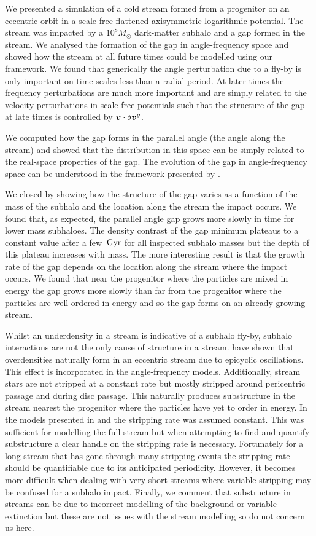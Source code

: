 \documentclass[useAMS,usenatbib,fleqn,a4paper]{mn2e}
\def\Gyr{\,{\rm Gyr}}
\newcommand{\bs}[1]{\bmath{#1}}
\begin{document}
We presented a simulation of a cold stream formed from a progenitor on an eccentric orbit in a scale-free flattened axisymmetric logarithmic potential. The stream was impacted by a $10^8M_\odot$ dark-matter subhalo and a gap formed in the stream. We analysed the formation of the gap in angle-frequency space and showed how the stream at all future times could be modelled using our framework. We found that generically the angle perturbation due to a fly-by is only important on time-scales less than a radial period. At later times the frequency perturbations are much more important and are simply related to the velocity perturbations in scale-free potentials such that the structure of the gap at late times is controlled by $\bs{v}\cdot\delta\bs{v}^g$.

We computed how the gap forms in the parallel angle (the angle along the stream) and showed that the distribution in this space can be simply related to the real-space properties of the gap. The evolution of the gap in angle-frequency space can be understood in the framework presented by \cite{ErkalBelokurov2015}.

We closed by showing how the structure of the gap varies as a function of the mass of the subhalo and the location along the stream the impact occurs. We found that, as expected, the parallel angle gap grows more slowly in time for lower mass subhaloes. The density contrast of the gap minimum plateaus to a constant value after a few $\Gyr$ for all inspected subhalo masses but the depth of this plateau increases with mass. The more interesting result is that the growth rate of the gap depends on the location along the stream where the impact occurs. We found that near the progenitor where the particles are mixed in energy the gap grows more slowly than far from the progenitor where the particles are well ordered in energy and so the gap forms on an already growing stream.

Whilst an underdensity in a stream is indicative of a subhalo fly-by, subhalo interactions are not the only cause of structure in a stream. \cite{Kuepper2010} have shown that overdensities naturally form in an eccentric stream due to epicyclic oscillations. This effect is incorporated in the angle-frequency models. Additionally, stream stars are not stripped at a constant rate but mostly stripped around pericentric passage and during disc passage. This naturally produces substructure in the stream nearest the progenitor where the particles have yet to order in energy. In the models presented in \cite{Bovy2014} and \cite{Sanders2014} the stripping rate was assumed constant. This was sufficient for modelling the full stream but when attempting to find and quantify substructure a clear handle on the stripping rate is necessary. Fortunately for a long stream that has gone through many stripping events the stripping rate should be quantifiable due to its anticipated periodicity. However, it becomes more difficult when dealing with very short streams where variable stripping may be confused for a subhalo impact. Finally, we comment that substructure in streams can be due to incorrect modelling of the background or variable extinction but these are not issues with the stream modelling so do not concern us here.
\end{document}

